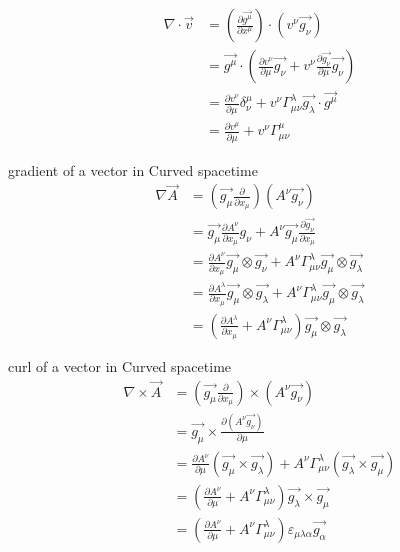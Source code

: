 \documentclass[12pt, a4paper, oneside, UTF8]{ctexbook}  %
\newcommand{\pa}{\partial}
\begin{document}
\begin{corollary}
    \begin{align*}
        \nabla\cdot\vec{v}&=\left(\frac{\pa \vec{g^\mu}}{\pa x^\mu}\right)
        \cdot\left(v^\nu\vec{g_\nu}\right)\\
        &=\vec{g^\mu}\cdot\left(\frac{\pa v^\nu}{\pa\mu}\vec{g_\nu}+
        v^\nu\frac{\pa\vec{g_\nu}}{\pa \mu}\vec{g_\nu}\right)\\
        &=\frac{\pa v^\nu}{\pa\mu}\delta_\nu^\mu+v^\nu\Gamma^\lambda_{\mu\nu}\vec{g_\lambda}\cdot\vec{g^\mu}\\
        &=\frac{\pa v^\mu}{\pa\mu}+v^\nu\Gamma^\mu_{\mu\nu}
    \end{align*}
\end{corollary}
\begin{defn}
    gradient of a vector in Curved spacetime
    \begin{align*}
        \nabla\vec{A}&=\left(\vec{g_\mu}\frac{\pa}{\pa x_\mu}\right)
        \left(A^\nu \vec{g_\nu}\right)\\
        &=\vec{g_\mu}\frac{\pa A^\nu}{\pa x_\mu}g_\nu
        +A^\nu\vec{g_\mu}\frac{\pa\vec{g_\nu}}{\pa x_\mu}\\
        &=\frac{\pa A^\nu}{\pa x_\mu}\vec{g_\mu}\otimes\vec{g_\nu}
        +A^\nu\Gamma^\lambda_{\mu\nu}\vec{g_\mu}\otimes\vec{g_\lambda}\\
        &=\frac{\pa A^\lambda}{\pa x_\mu}\vec{g_\mu}\otimes\vec{g_\lambda}
        +A^\nu\Gamma^\lambda_{\mu\nu}\vec{g_\mu}\otimes\vec{g_\lambda}\\
        &=\left(\frac{\pa A^\lambda}{\pa x_\mu}+A^\nu\Gamma^\lambda_{\mu\nu}\right)\vec{g_\mu}\otimes\vec{g_\lambda}
    \end{align*}
\end{defn}
\begin{defn}
    curl of a vector in Curved spacetime
    \begin{align*}
        \nabla\times\vec{A}&=\left(\vec{g_\mu}\frac{\pa}{\pa x_\mu}\right)
        \times\left(A^\nu \vec{g_\nu}\right)\\
        &=\vec{g_\mu}\times\frac{\pa\left(A^\nu\vec{g_\nu}\right)}{\pa \mu}\\
        &=\frac{\pa A^\nu}{\pa\mu}\left(\vec{g_\mu}\times\vec{g_\lambda}\right)
        +A^\nu\Gamma^\lambda_{\mu\nu}\left(\vec{g_\lambda}\times\vec{g_\mu}\right)\\
        &=\left(\frac{\pa A^\nu}{\pa\mu}+A^\nu\Gamma^\lambda_{\mu\nu}\right)
        \vec{g_\lambda}\times\vec{g_\mu}\\
        &=\left(\frac{\pa A^\nu}{\pa\mu}+A^\nu\Gamma^\lambda_{\mu\nu}\right)
        \varepsilon_{\mu\lambda\alpha}\vec{g_\alpha}
    \end{align*}
\end{defn}
\end{document}
